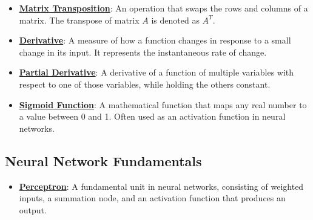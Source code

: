 \documentclass{article}%
\begin{document}
\begin{itemize}[leftmargin=*]
\item \href{https://purdue.brightspace.com/d2l/common/assets/pdfjs-d2l-dist/1.0.14-legacy/web/viewer.html?file=\%2Fcontent\%2Fenforced\%2F1095467-wl.202510.CS.24300.001\%2F04L1-Linear Algebra Primer.pdf\%3Fou\%3D1095467\&lang=en-us\&container=d2l-fileviewer-rendered-pdf\&fullscreen=d2l-fileviewer-rendered-pdf-dialog\&height=667#page=16}{\textbf{Matrix Transposition}}: An operation that swaps the rows and columns of a matrix. The transpose of matrix $A$ is denoted as $A^T$.%
\item \href{https://purdue.brightspace.com/d2l/common/assets/pdfjs-d2l-dist/1.0.14-legacy/web/viewer.html?file=\%2Fcontent\%2Fenforced\%2F1095467-wl.202510.CS.24300.001\%2F04L1-Linear Algebra Primer.pdf\%3Fou\%3D1095467\&lang=en-us\&container=d2l-fileviewer-rendered-pdf\&fullscreen=d2l-fileviewer-rendered-pdf-dialog\&height=667#page=21}{\textbf{Derivative}}: A measure of how a function changes in response to a small change in its input. It represents the instantaneous rate of change.%
\item \href{https://purdue.brightspace.com/d2l/common/assets/pdfjs-d2l-dist/1.0.14-legacy/web/viewer.html?file=\%2Fcontent\%2Fenforced\%2F1095467-wl.202510.CS.24300.001\%2F04L1-Linear Algebra Primer.pdf\%3Fou\%3D1095467\&lang=en-us\&container=d2l-fileviewer-rendered-pdf\&fullscreen=d2l-fileviewer-rendered-pdf-dialog\&height=667#page=19}{\textbf{Partial Derivative}}: A derivative of a function of multiple variables with respect to one of those variables, while holding the others constant.%
\item \href{https://purdue.brightspace.com/d2l/common/assets/pdfjs-d2l-dist/1.0.14-legacy/web/viewer.html?file=\%2Fcontent\%2Fenforced\%2F1095467-wl.202510.CS.24300.001\%2F04L1-Linear Algebra Primer.pdf\%3Fou\%3D1095467\&lang=en-us\&container=d2l-fileviewer-rendered-pdf\&fullscreen=d2l-fileviewer-rendered-pdf-dialog\&height=667#page=21}{\textbf{Sigmoid Function}}: A mathematical function that maps any real number to a value between 0 and 1. Often used as an activation function in neural networks.%
\end{itemize}

%
\subsection{Neural Network Fundamentals}%
\label{subsec:NeuralNetworkFundamentals}%
\begin{itemize}[leftmargin=*]%
\item \href{https://purdue.brightspace.com/d2l/common/assets/pdfjs-d2l-dist/1.0.14-legacy/web/viewer.html?file=\%2Fcontent\%2Fenforced\%2F1095467-wl.202510.CS.24300.001\%2F02L2-Intro.pdf\%3Fou\%3D1095467\&lang=en-us\&container=d2l-fileviewer-rendered-pdf\&fullscreen=d2l-fileviewer-rendered-pdf-dialog\&height=667#page=45}{\textbf{Perceptron}}: A fundamental unit in neural networks, consisting of weighted inputs, a summation node, and an activation function that produces an output.%
\end{itemize}
\end{document}
